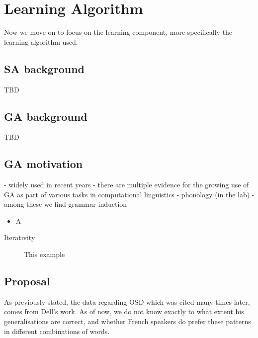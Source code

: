 \documentclass{article}
\begin{document}
\clearpage
\section{Learning Algorithm} 
Now we move on to focus on the learning component, more specifically the learning algorithm used.

\subsection{SA background} %
TBD
\subsection{GA background} %
TBD
\subsection{GA motivation} %
- widely used in recent years
- there are multiple evidence for the growing use of GA as part of various tasks in computational linguistics
- phonology (in the lab)
- among these we find grammar induction

\begin{itemize}
  \item A
\end{itemize}

\begin{description}
   \item[Iterativity] This example
\end{description}

\subsection{Proposal} %
As previously stated, the data regarding OSD which was cited many times later, comes from Dell's work. As of now, we do not know exactly to what extent his generalisations are correct, and whether French speakers do prefer these patterns in different combinations of words.
\end{document}
